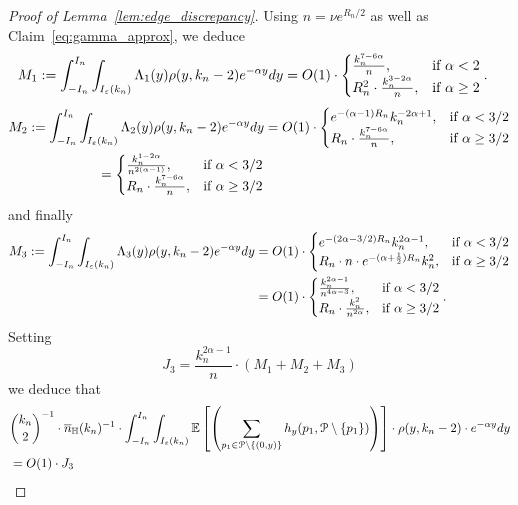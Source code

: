 \begin{proof}[Proof of Lemma~\ref{lem:edge_discrepancy}]
Using $n=\nu e^{R_n/2}$ as well as Claim~\ref{eq:gamma_approx}, 
we deduce
\begin{align*} 
M_1:= \int_{-I_n}^{I_n} \int_{I_\varepsilon (k_n)} \Lambda_1 (y)  \rho(y,k_n-2) e^{-\alpha y} dy
&= O(1) \cdot 
\begin{cases} 
\frac{k_n^{7-6\alpha}}{n}, & \mbox{if $\alpha <2$} \\
R_n^2 \cdot \frac{k_n^{3-2\alpha}}{n}, & \mbox{if $\alpha \geq 2$}
\end{cases}. 
\end{align*}
\begin{align*} 
M_2:= \int_{-I_n}^{I_n} \int_{I_\varepsilon (k_n)} \Lambda_2 (y)  \rho(y,k_n-2) e^{-\alpha y} dy
&= O(1) \cdot 
\begin{cases}
e^{-(\alpha - 1)R_n} k_n^{-2\alpha+1}, & \mbox{if $\alpha < 3/2$} \\
R_n  \cdot \frac{k_n^{7-6\alpha }}{n}, & \mbox{if $\alpha \geq 3/2$}
\end{cases} 
\\
=\begin{cases}
\frac{k_n^{1-2\alpha}}{n^{2(\alpha-1)}}, & \mbox{if $\alpha < 3/2$} \\
R_n  \cdot \frac{k_n^{7-6\alpha }}{n}, & \mbox{if $\alpha \geq 3/2$}
\end{cases}
\end{align*}
and finally 
\begin{align*} 
M_3:=\int_{-I_n}^{I_n} \int_{I_\varepsilon (k_n)} \Lambda_3 (y)  \rho(y,k_n-2) e^{-\alpha y} dy
&= O(1) \cdot 
\begin{cases} 
e^{-(2\alpha - 3/2) R_n} k_n^{2\alpha - 1}, & \mbox{if $\alpha <3/2$} \\ 
R_n \cdot n \cdot e^{-(\alpha +\frac12)R_n} k_n^2, &\mbox{if $\alpha \geq 3/2$}
\end{cases} \\
&=O(1) \cdot 
\begin{cases} 
\frac{k_n^{2\alpha - 1}}{n^{4\alpha -3}}, & \mbox{if $\alpha <3/2$} \\ 
R_n \cdot \frac{k_n^2}{n^{2\alpha}}, &\mbox{if $\alpha \geq 3/2$}
\end{cases}  .
\end{align*}
Setting 
$$ J_3 = \frac{k_n^{2\alpha-1}}{n}\cdot  \left(M_1+ M_2 + M_3 \right) $$
we deduce that 
\begin{align*}
&{k_n\choose 2}^{-1}\cdot \overline{n}_{\mathbb{H}}(k_n)^{-1} \cdot \int_{-I_n}^{I_n} \int_{I_\varepsilon (k_n)} \mathbb{E}\left[\left( \sum_{p_1 \in {\mathcal P} \setminus \{(0,y)\}} h_y (p_1, {\mathcal P} \setminus \{ p_1 \})\right)\right] \cdot  \rho(y,k_n-2) \cdot e^{-\alpha y} dy \\
&= O(1) \cdot J_3
\end{align*}



\end{proof}
